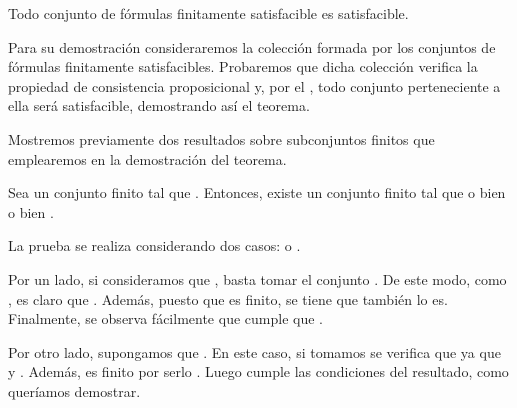 \begin{isabellebody}
\begin{isamarkuptext}
  \begin{teorema}
    Todo conjunto de fórmulas finitamente satisfacible es satisfacible.
  \end{teorema}

  Para su demostración consideraremos la colección formada por los conjuntos de fórmulas finitamente 
  satisfacibles. Probaremos que dicha colección verifica la propiedad de consistencia proposicional
  y, por el , todo conjunto perteneciente a ella será
  satisfacible, demostrando así el teorema.

  Mostremos previamente dos resultados sobre subconjuntos finitos que emplearemos en la 
  demostración del teorema.

  \begin{lema}
    Sea  un conjunto finito tal que . Entonces, existe un conjunto finito  
    tal que o bien  o bien .
  \end{lema}

  \begin{demostracion}
   La prueba se realiza considerando dos casos:  o .

   Por un lado, si consideramos que , basta tomar el conjunto . 
   De este modo, como , es claro que . Además, puesto que  es finito,
   se tiene que  también lo es. Finalmente, se observa fácilmente que cumple que .

   Por otro lado, supongamos que . En este caso, si tomamos  se verifica que
    ya que  y . Además,  es finito por serlo . Luego cumple
   las condiciones del resultado, como queríamos demostrar.
  \end{demostracion}


\end{isamarkuptext}
\end{isabellebody}
